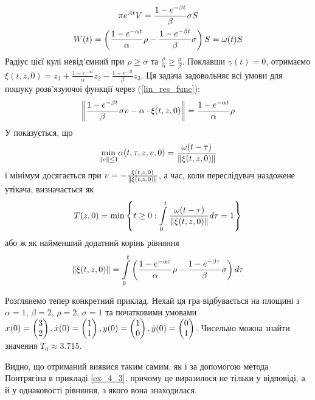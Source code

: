 \begin{example}
\begin{gather*}
        \pi e^{At} V = \frac{1 - e^{-\beta t}}{\beta} \sigma S \\
        W(t) = \left(\frac{1 - e^{-\alpha t}}{\alpha} \rho - \frac{1 - e^{-\beta t}}{\beta} \sigma\right) S = \omega(t) S
    \end{gather*}
    Радіус цієї кулі невід'ємний при $\rho \geq \sigma$ та $\frac{\rho}{\alpha} \geq \frac{\sigma}{\beta}$.
    Поклавши $\gamma(t) = 0$, отримаємо
    $\xi(t, z, 0) = z_1 + \frac{1 - e^{-\alpha t}}{\alpha} z_2 - \frac{1 - e^{-\beta t}}{\beta}z_3$.
    Ця задача задовольняє всі умови для пошуку розв'язуючої функції через (\ref{lin_res_func}):
    \begin{gather*}
        \left\Vert \frac{1 - e^{-\beta t}}{\beta} \sigma v - \alpha \cdot \xi(t, z, 0) \right\Vert = \frac{1 - e^{-\alpha t}}{\alpha} \rho
    \end{gather*}
    У \cite{6} показується, що 
    \begin{gather*}
        \underset{\left\Vert v \right\Vert\leq 1}{\min}{\alpha(t, \tau, z, v, 0)} = \frac{\omega(t-\tau)}{\left\Vert \xi(t, z, 0) \right\Vert}
    \end{gather*}
    і мінімум досягається при $v = -\frac{\xi(t, z, 0)}{\left\Vert \xi(t, z, 0) \right\Vert}$, а час, коли переслідувач наздожене утікача, визначається як
    \begin{gather*}
        T(z, 0) = \min \left\{ t\geq 0 : \int\limits_0^t \frac{\omega(t-\tau)}{\left\Vert \xi(t, z, 0) \right\Vert} d\tau = 1 \right\}
    \end{gather*}
    або ж як найменший додатний корінь рівняння
    \begin{gather*}
        \left\Vert \xi(t, z, 0) \right\Vert = \int\limits_0^t \left(\frac{1 - e^{-\alpha \tau}}{\alpha} \rho - \frac{1 - e^{-\beta \tau}}{\beta} \sigma\right) d\tau
    \end{gather*}
    
    Розглянемо тепер конкретний приклад. Нехай ця гра відбувається на площині з 
    $\alpha=1$, $\beta=2$, $\rho=2$, $\sigma=1$ та
    початковими умовами $x(0) = \begin{pmatrix}
        3 \\ 2
    \end{pmatrix}, \dot{x}(0) = \begin{pmatrix}
        1 \\ 1
    \end{pmatrix}, y(0) = \begin{pmatrix}
        1 \\ 0
    \end{pmatrix}, \dot{y}(0) = \begin{pmatrix}
        0 \\ 1
    \end{pmatrix}$.
    Чисельно можна знайти значення $T_0 \approx 3.715$.
    \begin{center}
        
    \end{center}
    Видно, що отриманий виявися таким самим, як і за допомогою метода Понтрягіна в прикладі
    \ref{ex_4_3}, причому це виразилося не тільки у відповіді, а й у однаковості рівняння,
    з якого вона знаходилася.
\end{example}